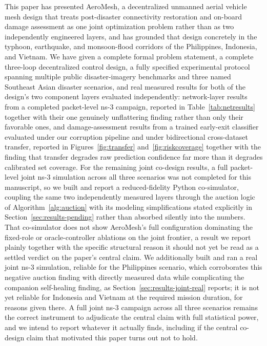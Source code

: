 \documentclass[drones,article,submit,moreauthors]{Definitions/mdpi}
\begin{document}
This paper has presented AeroMesh, a decentralized unmanned aerial vehicle mesh design that treats post-disaster connectivity restoration and on-board damage assessment as one joint optimization problem rather than as two independently engineered layers, and has grounded that design concretely in the typhoon, earthquake, and monsoon-flood corridors of the Philippines, Indonesia, and Vietnam. We have given a complete formal problem statement, a complete three-loop decentralized control design, a fully specified experimental protocol spanning multiple public disaster-imagery benchmarks and three named Southeast Asian disaster scenarios, and real measured results for both of the design's two component layers evaluated independently: network-layer results from a completed packet-level ns-3 campaign, reported in Table~\ref{tab:netresults} together with their one genuinely unflattering finding rather than only their favorable ones, and damage-assessment results from a trained early-exit classifier evaluated under our corruption pipeline and under bidirectional cross-dataset transfer, reported in Figures~\ref{fig:transfer} and~\ref{fig:riskcoverage} together with the finding that transfer degrades raw prediction confidence far more than it degrades calibrated set coverage. For the remaining joint co-design results, a full packet-level joint ns-3 simulation across all three scenarios was not completed for this manuscript, so we built and report a reduced-fidelity Python co-simulator, coupling the same two independently measured layers through the auction logic of Algorithm~\ref{alg:auction} with its modeling simplifications stated explicitly in Section~\ref{sec:results-pending} rather than absorbed silently into the numbers. That co-simulator does not show AeroMesh's full configuration dominating the fixed-role or oracle-controller ablations on the joint frontier, a result we report plainly together with the specific structural reason it should not yet be read as a settled verdict on the paper's central claim. We additionally built and ran a real joint ns-3 simulation, reliable for the Philippines scenario, which corroborates this negative auction finding with directly measured data while complicating the companion self-healing finding, as Section~\ref{sec:results-joint-real} reports; it is not yet reliable for Indonesia and Vietnam at the required mission duration, for reasons given there. A full joint ns-3 campaign across all three scenarios remains the correct instrument to adjudicate the central claim with full statistical power, and we intend to report whatever it actually finds, including if the central co-design claim that motivated this paper turns out not to hold.
\end{document}
